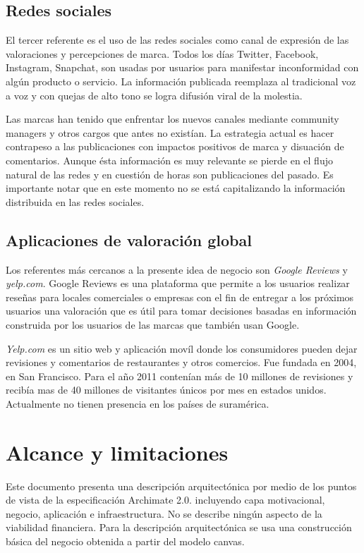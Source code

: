 \subsection{Redes sociales}

El tercer referente es el uso de las redes sociales como canal de expresión de las valoraciones y percepciones de marca. Todos los días Twitter, Facebook, Instagram, Snapchat, son usadas por usuarios para manifestar inconformidad con algún producto o servicio. La información publicada  reemplaza al tradicional voz a voz y con quejas de alto tono se logra difusión viral de la molestia. 

Las marcas han tenido que enfrentar los nuevos canales mediante community managers y otros cargos que antes no existían. La estrategia actual es hacer contrapeso a las publicaciones con impactos positivos de marca y disuación de comentarios. Aunque ésta información es muy relevante se pierde en el flujo natural de las redes y en cuestión de horas son publicaciones del pasado. Es importante notar que en este momento no se está capitalizando la información distribuida en las redes sociales.

\subsection{Aplicaciones de valoración global}

Los referentes más cercanos a la presente idea de negocio son \textit{Google Reviews} y \textit{yelp.com}\cite{luca2011reviews}. Google Reviews es una plataforma que permite a los usuarios realizar reseñas para locales comerciales o empresas con el fin de entregar a los próximos usuarios una valoración que es útil para tomar decisiones basadas en información construida por los usuarios de las marcas que también usan Google. 

\textit{Yelp.com} es un sitio web y aplicación movíl donde los consumidores pueden dejar revisiones y comentarios de restaurantes y otros comercios. Fue fundada en 2004, en San Francisco. Para el año 2011 contenían más de 10 millones de revisiones y recibía mas de 40 millones de visitantes únicos por mes en estados unidos. Actualmente no tienen presencia en los países de suramérica.

\section{Alcance y limitaciones}

Este documento presenta una descripción arquitectónica por medio de los puntos de vista de la especificación Archimate 2.0. incluyendo capa motivacional, negocio, aplicación e infraestructura. No se describe ningún aspecto de la viabilidad financiera. Para la descripción arquitectónica se usa una construcción básica del negocio obtenida a partir del modelo canvas. 


